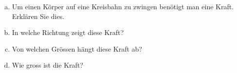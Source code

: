 \begin{aufgabe}
\begin{enumerate} [a)]
\item Um einen Körper auf eine Kreisbahn zu zwingen benötigt man eine Kraft. Erklären Sie dies.
\item In welche Richtung zeigt diese Kraft?
\item Von welchen Grössen hängt diese Kraft ab?
\item Wie gross ist die Kraft?
\end{enumerate}
\end{aufgabe}
\begin{loesung}

\end{loesung}
